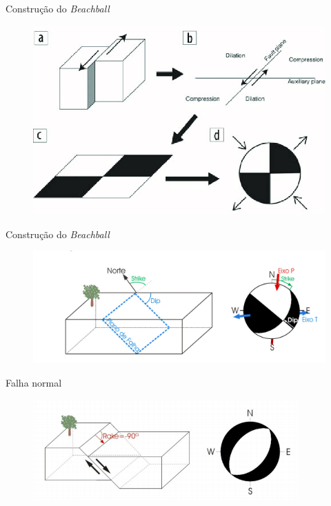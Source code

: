 \documentclass{beamer}
\begin{document}
\begin{frame}{Construção do \textit{Beachball}}
\begin{figure}[htb]
	\centering
	\includegraphics[scale=0.45]{sobre_falha}
\end{figure}
\end{frame}

\begin{frame}{Construção do \textit{Beachball}}
	\begin{figure}[htb]
	\centering
	\includegraphics[scale=0.65]{beachball}
\end{figure}
\end{frame}

\begin{frame}{Falha normal}
		\begin{figure}[htb]
		\centering
		\includegraphics[scale=0.9]{normal}
	\end{figure}
\end{frame}
\end{document}
